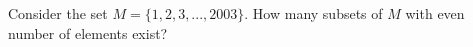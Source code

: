 Consider the set $M=\{1,2,3,...,2003\}$. How many subsets of $M$ with even number of elements exist?